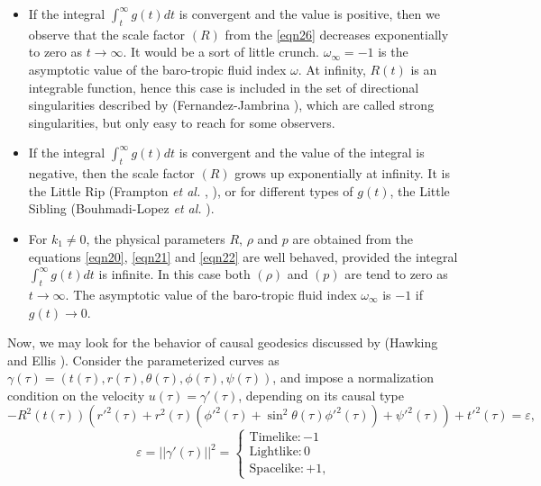\documentclass[11pt]{article}
\theoremstyle{theorem}
\theoremstyle{defi}
\begin{document}
 \begin{itemize}
 \item If the integral $\int_{t}^{\infty}g(t)dt$ is convergent and the value is positive, then we observe that the scale factor $(R)$ from the \eqref{eqn26} decreases exponentially to zero
 as $t\to\infty$. It would be a sort of little crunch. $\omega_{\infty}=-1$ is the asymptotic value of the baro-tropic fluid index $\omega$. 
 At infinity, $R(t)$ is an integrable function, hence this case is included in the set of directional singularities described by (Fernandez-Jambrina \cite{27}), which are called strong singularities, but only easy to reach
 for some observers.
\item If the integral $\int_{t}^{\infty}g(t)dt$ is convergent and the value of the integral is negative, then the scale factor $(R)$ grows up exponentially at infinity. It is the Little Rip (Frampton \emph{et al.} \cite{28}, \cite{37}), or for different types of $g(t)$, the Little Sibling (Bouhmadi-Lopez \emph{et al.} \cite{38}).
\item For $k_1\neq 0$, the physical parameters $R$, $\rho$ and $p$ are obtained from the equations \eqref{eqn20}, \eqref{eqn21} and \eqref{eqn22} are well behaved, provided the integral $\int_{t}^{\infty}g(t)dt$ is infinite. In this case both $(\rho)$ and $(p)$ are tend to zero as $t\to \infty$.
    The asymptotic value of the baro-tropic fluid index $\omega_{\infty}$ is $-1$ if $g(t)\to 0$.
    \end{itemize}
\par
Now, we may look for the behavior of causal geodesics discussed by (Hawking and Ellis \cite{39}). Consider the parameterized curves as $\gamma (\tau)=(t(\tau), r(\tau), \theta (\tau), \phi (\tau), \psi(\tau))$, and impose a normalization condition on the velocity $u(\tau)=\gamma'(\tau)$, depending on its causal type
\begin{equation}\nonumber
-R^2(t(\tau))\left(r'^2(\tau)+r^2(\tau)(\phi'^2(\tau)+\sin^2\theta(\tau)\phi'^2(\tau))+\psi'^2(\tau)\right)
+t'^2(\tau)=\varepsilon,
\end{equation}
\begin{equation}
\label{eqn33}
\varepsilon=||\gamma'(\tau)||^2
=\begin{cases} \mbox{Timelike}: -1 \\
\mbox {Lightlike}: 0 \\
\mbox {Spacelike}: +1,
\end{cases}
\end{equation}
\end{document}
